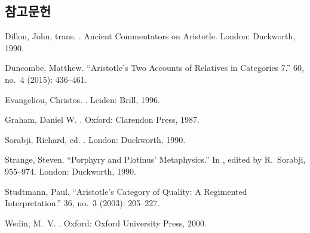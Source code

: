 \documentclass[12pt, a4paper]{article}
\begin{document}
\subsection*{참고문헌}
\begin{references}

 Dillon, John, trans. . Ancient Commentators on Aristotle. London: Duckworth, 1990.

 Duncombe, Matthew. ``Aristotle's Two Accounts of Relatives in Categories 7.''  60, no.\ 4 (2015): 436--461.

 Evangeliou, Christos. . Leiden: Brill, 1996.

 Graham, Daniel W. . Oxford: Clarendon Press, 1987.

 Sorabji, Richard, ed. . London: Duckworth, 1990.

 Strange, Steven. ``Porphyry and Plotinus' Metaphysics.'' In , edited by R.\ Sorabji, 955--974. London: Duckworth, 1990.

 Studtmann, Paul. ``Aristotle's Category of Quality: A Regimented Interpretation.''  36, no.\ 3 (2003): 205--227.

 Wedin, M.\ V. . Oxford: Oxford University Press, 2000.

\end{references}
\end{document}

